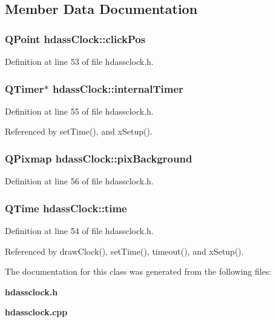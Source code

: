 \subsection{Member Data Documentation}
\subsubsection{\setlength{\rightskip}{0pt plus 5cm}QPoint {\bf hdass\-Clock::click\-Pos}\hspace{0.3cm}{\tt  [private]}}\label{classhdassClock_hdassClockr0}




Definition at line 53 of file hdassclock.h.
\subsubsection{\setlength{\rightskip}{0pt plus 5cm}QTimer$\ast$ {\bf hdass\-Clock::internal\-Timer}\hspace{0.3cm}{\tt  [private]}}\label{classhdassClock_hdassClockr2}




Definition at line 55 of file hdassclock.h.

Referenced by set\-Time(), and x\-Setup().
\subsubsection{\setlength{\rightskip}{0pt plus 5cm}QPixmap {\bf hdass\-Clock::pix\-Background}\hspace{0.3cm}{\tt  [private]}}\label{classhdassClock_hdassClockr3}




Definition at line 56 of file hdassclock.h.
\subsubsection{\setlength{\rightskip}{0pt plus 5cm}QTime {\bf hdass\-Clock::time}\hspace{0.3cm}{\tt  [private]}}\label{classhdassClock_hdassClockr1}




Definition at line 54 of file hdassclock.h.

Referenced by draw\-Clock(), set\-Time(), timeout(), and x\-Setup().

The documentation for this class was generated from the following files:\begin{CompactItemize}
\item 
{\bf hdassclock.h}\item 
{\bf hdassclock.cpp}\end{CompactItemize}
